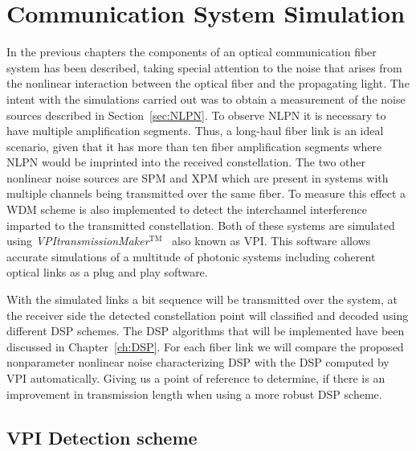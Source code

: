 
\chapter{Communication System Simulation }\label{ch:simu}
In the previous chapters the components of an optical communication fiber system has been described, taking special attention to the noise that arises from the nonlinear interaction between the optical fiber and the propagating light. The intent with the simulations carried out was to obtain a measurement of the noise sources described in Section~\ref{sec:NLPN}. To observe NLPN it is necessary to have multiple amplification segments. Thus, a long-haul fiber link is an ideal scenario, given that it has more than ten fiber amplification segments where NLPN would be imprinted into the received constellation. The two other nonlinear noise sources are SPM and XPM which are present in systems with multiple channels being transmitted over the same fiber. To measure this effect a WDM scheme is also implemented to detect the interchannel interference imparted to the transmitted constellation. Both of these systems are simulated using  \emph{VPItransmissionMaker$^\text{TM}$}~\cite{transmissionvpi} also known as VPI. This software allows accurate simulations of a multitude of photonic systems including coherent optical links as a plug and play software.


With the simulated links a bit sequence will be transmitted over the system, at the receiver side the detected constellation point will classified and decoded using different DSP schemes. The DSP algorithms that will be implemented have been discussed in Chapter~\ref{ch:DSP}. For each fiber link we will compare the proposed nonparameter nonlinear noise characterizing DSP with the DSP computed by VPI automatically. Giving us a point of reference to determine, if there is an improvement in transmission length when using a more robust DSP scheme. 

 







\section{VPI Detection scheme }\label{sec:VPIdec}



